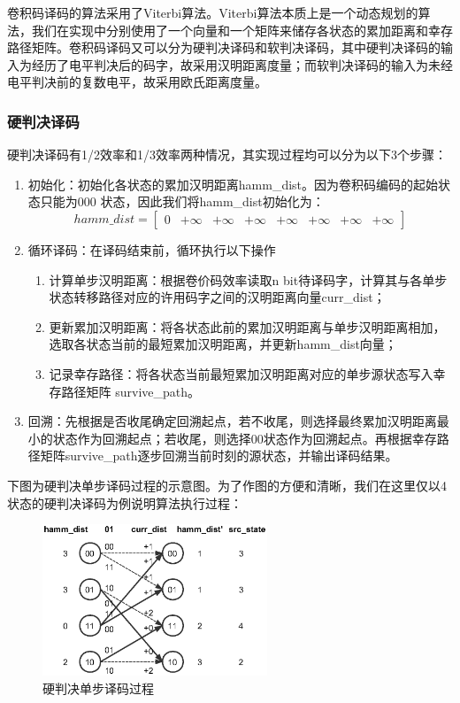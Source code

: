 卷积码译码的算法采用了Viterbi算法。Viterbi算法本质上是一个动态规划的算法，我们在实现中分别使用了一个向量和一个矩阵来储存各状态的累加距离和幸存路径矩阵。卷积码译码又可以分为硬判决译码和软判决译码，其中硬判决译码的输入为经历了电平判决后的码字，故采用汉明距离度量；而软判决译码的输入为未经电平判决前的复数电平，故采用欧氏距离度量。

\subsubsection{硬判决译码}

硬判决译码有1/2效率和1/3效率两种情况，其实现过程均可以分为以下3个步骤：

\begin{enumerate}
    \item 初始化：初始化各状态的累加汉明距离hamm\_dist。因为卷积码编码的起始状态只能为000 状态，因此我们将hamm\_dist初始化为：
    $$hamm\_dist=[
    \begin{matrix}
        0 & +\infty & +\infty & +\infty &
        +\infty & +\infty & +\infty & +\infty
    \end{matrix}
    ]$$
    \item 循环译码：在译码结束前，循环执行以下操作
    \begin{enumerate}
        \item 计算单步汉明距离：根据卷价码效率读取n bit待译码字，计算其与各单步状态转移路径对应的许用码字之间的汉明距离向量curr\_dist；
        \item 更新累加汉明距离：将各状态此前的累加汉明距离与单步汉明距离相加，选取各状态当前的最短累加汉明距离，并更新hamm\_dist向量；
        \item 记录幸存路径：将各状态当前最短累加汉明距离对应的单步源状态写入幸存路径矩阵 survive\_path。
    \end{enumerate}
    \item 回溯：先根据是否收尾确定回溯起点，若不收尾，则选择最终累加汉明距离最小的状态作为回溯起点；若收尾，则选择00状态作为回溯起点。再根据幸存路径矩阵survive\_path逐步回溯当前时刻的源状态，并输出译码结果。
\end{enumerate}

下图为硬判决单步译码过程的示意图。为了作图的方便和清晰，我们在这里仅以4状态的硬判决译码为例说明算法执行过程：

\begin{figure}[h]
    \centering
    \includegraphics[width=0.6\textwidth,trim=0 40 0 40,clip]{pic/2-2-1.eps}
    \caption{硬判决单步译码过程}
\end{figure}

